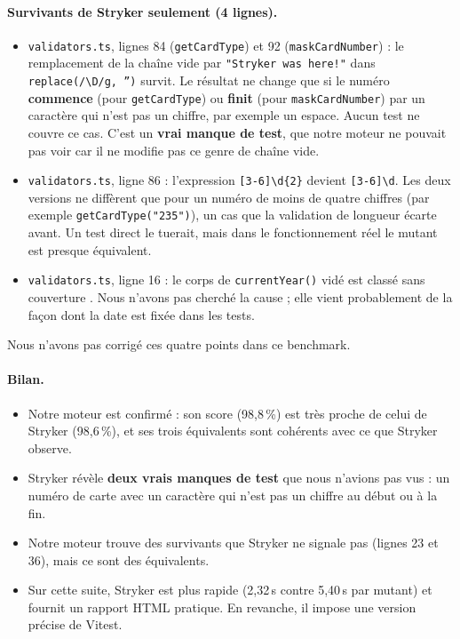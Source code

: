 \documentclass[12pt,a4paper]{article}
\begin{document}
\paragraph{Survivants de Stryker seulement (4 lignes).}
\begin{itemize}
    \item \texttt{validators.ts}, lignes 84 (\texttt{getCardType}) et 92 (\texttt{maskCardNumber}) : le remplacement de la chaîne vide par \texttt{"Stryker was here!"} dans \texttt{replace(/\textbackslash D/g, '')} survit. Le résultat ne change que si le numéro \textbf{commence} (pour \texttt{getCardType}) ou \textbf{finit} (pour \texttt{maskCardNumber}) par un caractère qui n'est pas un chiffre, par exemple un espace. Aucun test ne couvre ce cas. C'est un \textbf{vrai manque de test}, que notre moteur ne pouvait pas voir car il ne modifie pas ce genre de chaîne vide.
    \item \texttt{validators.ts}, ligne 86 : l'expression \texttt{[3-6]\textbackslash d\{2\}} devient \texttt{[3-6]\textbackslash d}. Les deux versions ne diffèrent que pour un numéro de moins de quatre chiffres (par exemple \texttt{getCardType("235")}), un cas que la validation de longueur écarte avant. Un test direct le tuerait, mais dans le fonctionnement réel le mutant est presque équivalent.
    \item \texttt{validators.ts}, ligne 16 : le corps de \texttt{currentYear()} vidé est classé \og sans couverture \fg{}. Nous n'avons pas cherché la cause ; elle vient probablement de la façon dont la date est fixée dans les tests.
\end{itemize}
Nous n'avons pas corrigé ces quatre points dans ce benchmark.

\paragraph{Bilan.}
\begin{itemize}
    \item Notre moteur est confirmé : son score (98{,}8\,\%) est très proche de celui de Stryker (98{,}6\,\%), et ses trois équivalents sont cohérents avec ce que Stryker observe.
    \item Stryker révèle \textbf{deux vrais manques de test} que nous n'avions pas vus : un numéro de carte avec un caractère qui n'est pas un chiffre au début ou à la fin.
    \item Notre moteur trouve des survivants que Stryker ne signale pas (lignes 23 et 36), mais ce sont des équivalents.
    \item Sur cette suite, Stryker est plus rapide (2{,}32\,s contre 5{,}40\,s par mutant) et fournit un rapport HTML pratique. En revanche, il impose une version précise de Vitest.
\end{itemize}
\end{document}
